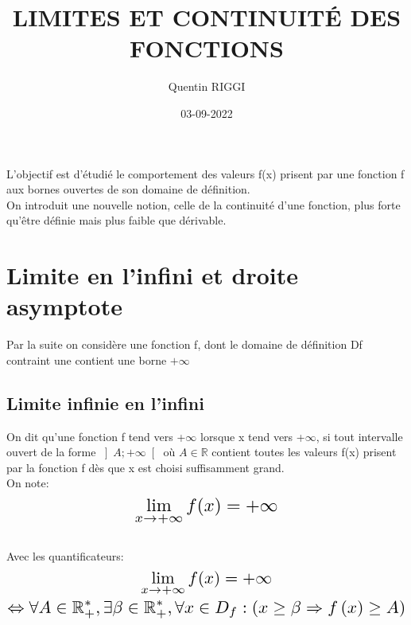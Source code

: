 \documentclass[a4paper]{article}
\title{\color{dark-red}\Huge LIMITES ET CONTINUITÉ DES FONCTIONS}
\date{03-09-2022}
\author{Quentin RIGGI}
\renewcommand{\large}{\color{text}}
\renewcommand{\textbf}{\color{crimson}}
\begin{document}
	\maketitle
	\large L'objectif est d'étudié le comportement des valeurs f(x) prisent par une fonction f aux bornes ouvertes de son domaine de définition.\\
	\large On introduit une nouvelle notion, celle de la continuité d'une fonction, plus forte qu'être définie mais plus faible que dérivable.
	
	
	\section{Limite en l'infini et droite asymptote}	
	\large Par la suite on considère une fonction f, dont le domaine de définition Df contraint une contient une borne $+\infty$ 

	\begin{center}
		\subsection*{Limite infinie en l'infini}	
	\end{center}
	\textbf{Definition:}
	\large On dit qu'une fonction f tend vers +$\infty$ lorsque x tend vers +$\infty$, si tout intervalle ouvert de la forme
	$\left]A; +\infty \right[$ où $A\in\mathbb{R}$ contient toutes les valeurs f(x) prisent par la fonction f dès que x est choisi suffisamment grand.\\
	\large On note:
	\begin{displaymath}
		\scaleto{\lim_{x\to+\infty} f(x) = +\infty}{25pt}
	\end{displaymath}
	\\
	\large Avec les quantificateurs:
	\begin{gather*}
		\scaleto{\lim_{x\to+\infty} f(x) = +\infty}{25pt} 
		\\
		\scaleto{\Leftrightarrow\forall A \in\mathbb{R}_{+}^{*},\exists\beta\in\mathbb{R}_{+}^{*},\forall x \in D_{f} : \left(x\geq\beta\Rightarrow f\left(x\right)\geq A \right)}{18pt}
	\end{gather*}
	
	\begin{center}
	\end{center}
	
\end{document}
